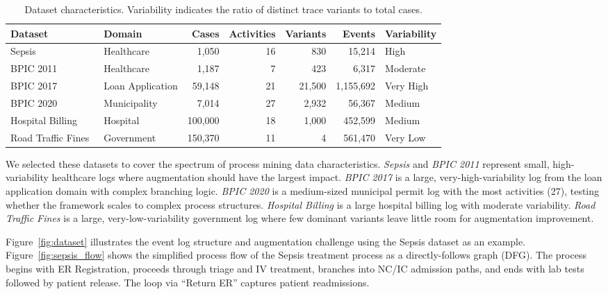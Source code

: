\documentclass[11pt,a4paper]{article}
\begin{document}
\begin{table}[t]
\centering
\caption{Dataset characteristics. Variability indicates the ratio of distinct trace variants to total cases.}
\label{tab:datasets}
\begin{tabular}{llrrrrl}
\toprule
\textbf{Dataset} & \textbf{Domain} & \textbf{Cases} & \textbf{Activities} & \textbf{Variants} & \textbf{Events} & \textbf{Variability} \\
\midrule
Sepsis~\cite{4tu_sepsis} & Healthcare & 1,050 & 16 & 830 & 15,214 & High \\
BPIC 2011~\cite{4tu_bpic2011} & Healthcare & 1,187 & 7 & 423 & 6,317 & Moderate \\
BPIC 2017~\cite{4tu_bpic2017} & Loan Application & 59,148 & 21 & 21,500 & 1,155,692 & Very High \\
BPIC 2020~\cite{4tu_bpic2020} & Municipality & 7,014 & 27 & 2,932 & 56,367 & Medium \\
Hospital Billing~\cite{4tu_hospital_billing} & Hospital & 100,000 & 18 & 1,000 & 452,599 & Medium \\
Road Traffic Fines~\cite{4tu_road_traffic} & Government & 150,370 & 11 & 4 & 561,470 & Very Low \\
\bottomrule
\end{tabular}
\end{table}

We selected these datasets to cover the spectrum of process mining data characteristics. \emph{Sepsis} and \emph{BPIC 2011} represent small, high-variability healthcare logs where augmentation should have the largest impact. \emph{BPIC 2017} is a large, very-high-variability log from the loan application domain with complex branching logic. \emph{BPIC 2020} is a medium-sized municipal permit log with the most activities (27), testing whether the framework scales to complex process structures. \emph{Hospital Billing} is a large hospital billing log with moderate variability. \emph{Road Traffic Fines} is a large, very-low-variability government log where few dominant variants leave little room for augmentation improvement.

Figure~\ref{fig:dataset} illustrates the event log structure and augmentation challenge using the Sepsis dataset as an example. Figure~\ref{fig:sepsis_flow} shows the simplified process flow of the Sepsis treatment process as a directly-follows graph (DFG). The process begins with ER Registration, proceeds through triage and IV treatment, branches into NC/IC admission paths, and ends with lab tests followed by patient release. The loop via ``Return ER'' captures patient readmissions.
\end{document}
